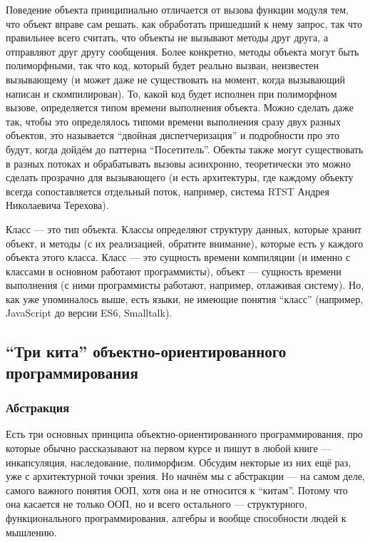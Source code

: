 \documentclass[a5paper]{article}
\begin{document}
Поведение объекта принципиально отличается от вызова функции модуля тем, что объект вправе сам решать, как обработать пришедший к нему запрос, так что правильнее всего считать, что объекты не вызывают методы друг друга, а отправляют друг другу сообщения. Более конкретно, методы объекта могут быть полиморфными, так что код, который будет реально вызван, неизвестен вызывающему (и может даже не существовать на момент, когда вызывающий написан и скомпилирован). То, какой код будет исполнен при полиморфном вызове, определяется типом времени выполнения объекта. Можно сделать даже так, чтобы это определялось типоми времени выполнения сразу двух разных объектов, это называется ``двойная диспетчеризация'' и подробности про это будут, когда дойдём до паттерна ``Посетитель''. Обекты также могут существовать в разных потоках и обрабатывать вызовы асинхронно, теоретически это можно сделать прозрачно для вызывающего (и есть архитектуры, где каждому объекту всегда сопоставляется отдельный поток, например, система RTST Андрея Николаевича Терехова).

Класс --- это тип объекта. Классы определяют структуру данных, которые хранит объект, и методы (с их реализацией, обратите внимание), которые есть у каждого объекта этого класса. Класс --- это сущность времени компиляции (и именно с классами в основном работают программисты), объект --- сущность времени выполнения (с ними программисты работают, например, отлаживая систему). Но, как уже упоминалось выше, есть языки, не имеющие понятия ``класс'' (например, JavaScript до версии ES6, Smalltalk).

\subsection{``Три кита'' объектно-ориентированного программирования}

\subsubsection{Абстракция}

Есть три основных принципа объектно-ориентированного программирования, про которые обычно рассказывают на первом курсе и пишут в любой книге --- инкапсуляция, наследование, полиморфизм. Обсудим некторые из них ещё раз, уже с архитектурной точки зрения. Но начнём мы с абстракции --- на самом деле, самого важного понятия ООП, хотя она и не относится к ``китам''. Потому что она касается не только ООП, но и всего остального --- структурного, функционального программирования, алгебры и вообще способности людей к мышлению.
\end{document}
